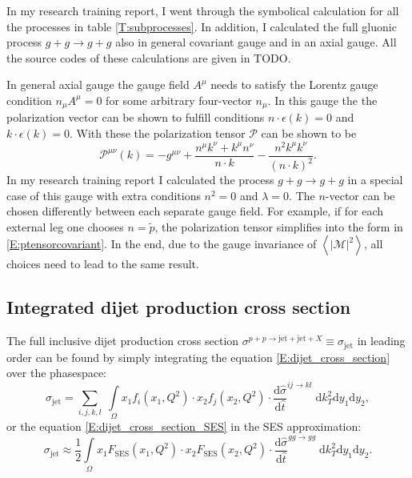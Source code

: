 \documentclass[a4paper, twoside, english, 12pt]{article}
\begin{document}
In my research training report, I went through the symbolical calculation for all the processes in table \ref{T:subprocesses}. In addition, I calculated the full gluonic process $g+g\rightarrow g+g$ also in general covariant gauge and in an axial gauge. All the source codes of these calculations are given in TODO.

In general axial gauge the gauge field $A^\mu$ needs to satisfy the Lorentz gauge condition $n_\mu A^\mu=0$ for some arbitrary four-vector $n_\mu$. In this gauge the the polarization vector can be shown to fulfill conditions $n\cdot\epsilon(k)=0$ and $k\cdot\epsilon(k)=0$. With these the polarization tensor $\mathcal{P}$ can be shown to be
\begin{equation}
\mathcal{P}^{\mu\nu} (k) =  -g^{\mu\nu} +\frac{n^\mu k^\nu+k^\mu n^\nu}{n\cdot k} -\frac{n^2 k^\mu k^\nu}{(n\cdot k)^2}.
\end{equation}
In my research training report I calculated the process $g+g\rightarrow g+g$ in a special case of this gauge with extra conditions $n^2=0$ and $\lambda=0$. The $n$-vector can be chosen differently between each separate gauge field. For example, if for each external leg one chooses $n=\tilde{p}$, the polarization tensor simplifies into the form in \eqref{E:ptensorcovariant}. In the end, due to the gauge invariance of $\left\langle|\mathcal{M}|^2\right\rangle$, all choices need to lead to the same result.



\subsection{Integrated dijet production cross section}

The full inclusive dijet production cross section $\sigma^{p+p\rightarrow\text{jet}+\text{jet}+X} \equiv \sigma_{\text{jet}}$ in leading order can be found by simply integrating the equation \eqref{E:dijet_cross_section} over the phasespace:
\begin{equation}\label{E:integrated_sigma_jet}
	\sigma_{\text{jet}} = \sum_{i,j,k,l}\;\int\limits_{\Omega} x_1f_i(x_1,Q^2)\cdot x_2f_j(x_2,Q^2) \cdot\frac{\text{d}\hat{\sigma}}{\text{d}\hat{t}}^{ij\rightarrow kl}\;\text{d}k_T^2\text{d}y_1\text{d}y_2 , 
\end{equation}
or the equation \eqref{E:dijet_cross_section_SES} in the SES approximation:
\begin{equation}\label{E:integrated_sigma_jet_SES}
\sigma_{\text{jet}} \approx \frac{1}{2}\int\limits_{\Omega} x_1F_{\text{SES}}(x_1,Q^2)\cdot x_2F_{\text{SES}}(x_2,Q^2) \cdot\frac{\text{d}\hat{\sigma}}{\text{d}\hat{t}}^{gg\rightarrow gg}\;\text{d}k_T^2\text{d}y_1\text{d}y_2 .
\end{equation}
\end{document}
